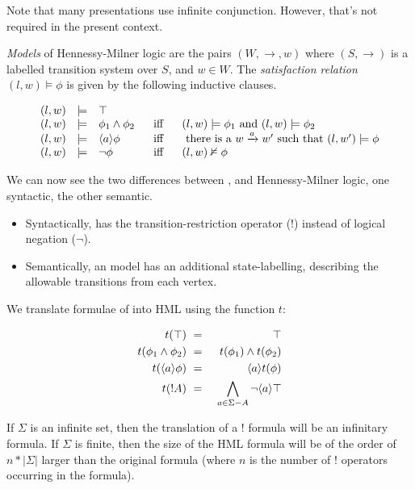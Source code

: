 \NI Note that many presentations use infinite conjunction. However,
that's not required in the present context.

 \emph{Models} of Hennessy-Milner logic are the pairs $(W,
\rightarrow, w)$ where $(S, \rightarrow)$ is a labelled transition
system over $S$, and $w \in W$.  The \emph{satisfaction relation} $(l,
w) \models \phi$ is given by the following inductive clauses.

\[
\begin{array}{lclcl}
  (l,w) & \models & \top  \\
  (l,w) & \models & \phi_1 \land \phi_2 &\  \mbox{ iff }\  & (l,w)  \models \phi_1 \mbox { and } (l,w) \models \phi_2  \\
  (l,w) & \models & \langle a \rangle \phi & \mbox{ iff } & \mbox{ there is a } w \xrightarrow{a} w' \mbox { such that } (l,w') \models \phi  \\
  (l,w) & \models & \neg \phi & \mbox{ iff } & (l,w)  \nvDash \phi 
\end{array}
\]

\NI We can now see the two differences between \ELFULL{}, and
Hennessy-Milner logic, one syntactic, the other semantic.

\begin{itemize}

\item Syntactically, \ELABR{} has the transition-restriction operator ($!$)
  instead of logical negation ($\neg$).

\item Semantically, an \ELABR{} model has an additional state-labelling,
  describing the allowable transitions from each vertex.

\end{itemize}

\NI We translate formulae of \ELABR{} into HML using the function $t$:

\begin{eqnarray*}
  t(\top) & \ = \ & \top  \\
  t(\phi_1 \land \phi_2) & \ = \ & t(\phi_1) \land t(\phi_2)  \\
  t(\langle a \rangle \phi) & \ = \ & \langle a \rangle t(\phi)  \\
  t(! A) & \ = \ & \bigwedge_{a \in \Sigma - A} \neg \langle a \rangle \top 
\end{eqnarray*}

\NI If $\Sigma$ is an infinite set, then the translation of a $!$
formula will be an infinitary formula.  If $\Sigma$ is finite,
then the size of the HML formula will be of the order of $n *
| \Sigma |$ larger than the original \ELABR{} formula (where $n$ is the
number of $!$ operators occurring in the \ELABR{} formula).

